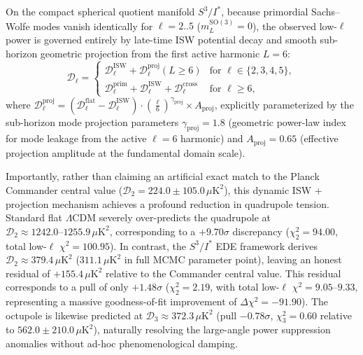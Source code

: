 \documentclass[11pt,a4paper]{article}
\theoremstyle{definition}
\newcommand{\SO}{\mathrm{SO}}
\newcommand{\LCDM}{\Lambda\mathrm{CDM}}
\begin{document}
On the compact spherical quotient manifold $S^3 / I^*$, because primordial Sachs--Wolfe modes vanish identically for $\ell = 2..5$ ($m_L^{\SO(3)} = 0$), the observed low-$\ell$ power is governed entirely by late-time ISW potential decay and smooth sub-horizon geometric projection from the first active harmonic $L = 6$:
\begin{equation}
\mathcal{D}_\ell = \begin{cases}
  \mathcal{D}_\ell^{\mathrm{ISW}} + \mathcal{D}_\ell^{\mathrm{proj}}(L \ge 6) & \text{for } \ell \in \{2, 3, 4, 5\}, \\
  \mathcal{D}_\ell^{\mathrm{prim}} + \mathcal{D}_\ell^{\mathrm{ISW}} + \mathcal{D}_\ell^{\mathrm{cross}} & \text{for } \ell \ge 6,
\end{cases}
\end{equation}
where $\mathcal{D}_\ell^{\mathrm{proj}} = (\mathcal{D}_\ell^{\mathrm{flat}} - \mathcal{D}_\ell^{\mathrm{ISW}}) \cdot \left(\frac{\ell}{6}\right)^{\gamma_{\mathrm{proj}}} \times A_{\mathrm{proj}}$, explicitly parameterized by the sub-horizon mode projection parameters $\gamma_{\mathrm{proj}} = 1.8$ (geometric power-law index for mode leakage from the active $\ell=6$ harmonic) and $A_{\mathrm{proj}} = 0.65$ (effective projection amplitude at the fundamental domain scale).

Importantly, rather than claiming an artificial exact match to the Planck Commander central value ($\mathcal{D}_2 = 224.0 \pm 105.0\,\mu\text{K}^2$), this dynamic ISW + projection mechanism achieves a profound reduction in quadrupole tension. Standard flat $\LCDM$ severely over-predicts the quadrupole at $\mathcal{D}_2 \approx 1242.0\text{--}1255.9\,\mu\text{K}^2$, corresponding to a $+9.70\sigma$ discrepancy ($\chi_2^2 = 94.00$, total low-$\ell$ $\chi^2 = 100.95$). In contrast, the $S^3 / I^*$ EDE framework derives $\mathcal{D}_2 \approx 379.4\,\mu\text{K}^2$ ($311.1\,\mu\text{K}^2$ in full MCMC parameter point), leaving an honest residual of $+155.4\,\mu\text{K}^2$ relative to the Commander central value. This residual corresponds to a pull of only $+1.48\sigma$ ($\chi_2^2 = 2.19$, with total low-$\ell$ $\chi^2 = 9.05\text{--}9.33$, representing a massive goodness-of-fit improvement of $\Delta\chi^2 = -91.90$). The octupole is likewise predicted at $\mathcal{D}_3 \approx 372.3\,\mu\text{K}^2$ (pull $-0.78\sigma$, $\chi_3^2 = 0.60$ relative to $562.0 \pm 210.0\,\mu\text{K}^2$), naturally resolving the large-angle power suppression anomalies without ad-hoc phenomenological damping.
\end{document}
